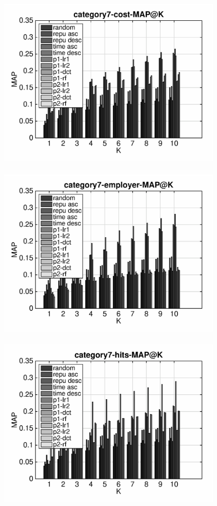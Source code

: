 \documentclass{article}
\begin{document}
\begin{figure}[ht]
\begin{flushleft}
\includegraphics[width=18cm,height=9cm]{category7-cost-MAP@K.eps}
\includegraphics[width=18cm,height=9cm]{category7-employer-MAP@K.eps}
\includegraphics[width=18cm,height=9cm]{category7-hits-MAP@K.eps}
\end{flushleft}
\end{figure}
\end{document}
